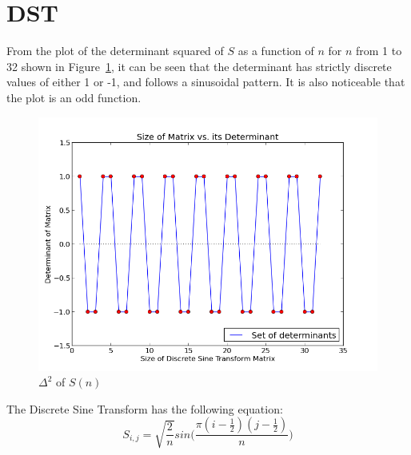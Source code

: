 \section{DST}
 From the plot of the determinant squared of $S$ as a function of $n$ for $n$
 from 1 to 32 shown in Figure~\ref{fig:S(n)}, it can be seen that the
 determinant has strictly discrete values of either 1 or -1, and follows a
 sinusoidal pattern. It is also noticeable that the plot is an odd function.

 \begin{figure}[h!]
   \centering
   \includegraphics[scale=0.6]{./img/dst_dets.png}
   \caption{$\Delta^2$ of $S(n)$}
   \label{fig:S(n)}
\end{figure}

 The Discrete Sine Transform has the following equation:
  \begin{equation}
   \label{eq:dst}
    S_{i,j}=\sqrt{\frac{2}{n}}sin \bigg(
    \frac{\pi(i-\frac{1}{2})(j-\frac{1}{2})}{n}\bigg)
   \end{equation}  
